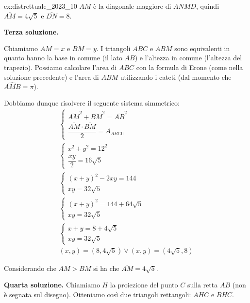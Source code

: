 \begin{soluzione}{ex:distrettuale_2023_10}
    $AM$ è la diagonale maggiore di $ANMD$, quindi $\overline{AM} = 4\sqrt {5}$ e $\overline{DN} = 8$.

    \bigskip
    \textbf{Terza soluzione.}

    Chiamiamo $\overline{AM} = x$ e $\overline{BM} = y$.
    I triangoli $ABC$ e $ABM$ sono equivalenti in quanto hanno la base in comune (il lato $AB$) e l'altezza in comune
    (l'altezza del trapezio).
    Possiamo calcolare l'area di $ABC$ con la formula di Erone (come nella soluzione precedente) e l'area di $ABM$
    utilizzando i cateti (dal momento che $A\hat{M}B = \pi$).

    Dobbiamo dunque risolvere il seguente sistema simmetrico:
    \begin{gather*}
        \begin{cases}
            \overline{AM}^2 + \overline{BM}^2 = \overline{AB}^2 \\
            \dfrac{\overline{AM} \cdot \overline{BM}}{2} = A_{ABC0}
        \end{cases}
        \\
        \begin{cases}
            x^2 + y^2 = 12^2 \\
            \dfrac{xy}{2} = 16\sqrt {5}
        \end{cases}
        \\
        \begin{cases}
            (x + y)^2 - 2xy = 144 \\
            xy = 32\sqrt{5}
        \end{cases}
        \\
        \begin{cases}
            (x+y)^2 = 144 + 64\sqrt {5} \\
            xy = 32\sqrt {5}
        \end{cases}
        \\
        \begin{cases}
            x + y = 8 + 4\sqrt {5} \\
            xy = 32\sqrt {5}
        \end{cases}
        \\
        (x, y) = (8, 4\sqrt {5}) \lor (x,y) = (4\sqrt {5}, 8)
    \end{gather*}

    Considerando che $AM > BM$ si ha che $\overline{AM} = 4\sqrt {5}$.

    \bigskip
    \textbf{Quarta soluzione.}
    Chiamiamo $H$ la proiezione del punto $C$ sulla retta $AB$ (non è segnata sul disegno).
    Otteniamo così due triangoli rettangoli: $AHC$ e $BHC$.


\end{soluzione}
